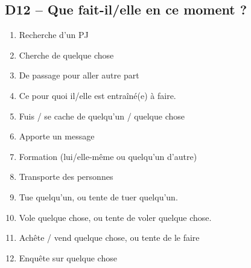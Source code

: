 \documentclass{article}
\begin{document}
\begin{multicols}{2}
	\section*{D12 -- Que fait-il/elle en ce moment ?}
	\begin{enumerate}
		\item Recherche d'un PJ
		\item Cherche de quelque chose
		\item De passage pour aller autre part
		\item Ce pour quoi il/elle est entra\^{i}né(e) à faire.
		\item Fuis / se cache de quelqu'un / quelque chose
		\item Apporte un message
		\item Formation (lui/elle-même ou quelqu'un d'autre)
		\item Transporte des personnes
		\item Tue quelqu'un, ou tente de tuer quelqu'un.
		\item Vole quelque chose, ou tente de voler quelque chose.
		\item Ach\^{e}te / vend quelque chose, ou tente de le faire
		\item Enqu\^{e}te sur quelque chose
	\end{enumerate}

\end{multicols}
\end{document}
